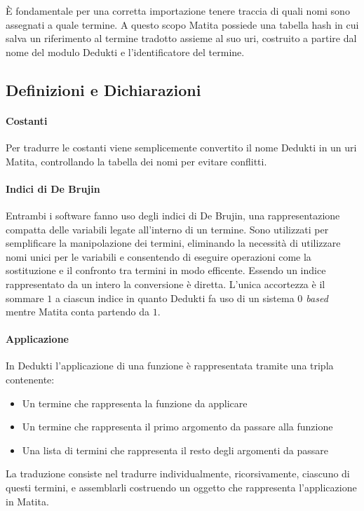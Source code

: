 \documentclass[12pt,a4paper]{mimosis}
\begin{document}
È fondamentale per una corretta importazione tenere traccia di quali nomi sono
assegnati a quale termine. A questo scopo Matita possiede una tabella hash in cui salva
un riferimento al termine tradotto assieme al suo uri, costruito a partire dal nome
del modulo Dedukti e l'identificatore del termine.


\subsection{Definizioni e Dichiarazioni}

\paragraph{Costanti}
Per tradurre le costanti viene semplicemente convertito il nome Dedukti in un 
uri Matita, controllando la tabella dei nomi per evitare conflitti.

\paragraph{Indici di De Brujin}
Entrambi i software fanno uso degli indici di De Brujin, una rappresentazione
compatta delle variabili legate all'interno di un termine. Sono utilizzati per
semplificare la manipolazione dei termini, eliminando la necessità di utilizzare
nomi unici per le variabili e consentendo di eseguire operazioni come la 
sostituzione e il confronto tra termini in modo efficente. 
Essendo un indice rappresentato da un intero la conversione è diretta.
L'unica accortezza è il sommare $1$ a ciascun indice in quanto
Dedukti fa uso di un sistema \textit{$0$ based} mentre Matita conta partendo
da $1$.

\paragraph{Applicazione}
In Dedukti l'applicazione di una funzione è rappresentata tramite una tripla
contenente: 
\begin{itemize}
  \item Un termine che rappresenta la funzione da applicare
  \item Un termine che rappresenta il primo argomento da passare alla funzione
  \item Una lista di termini che rappresenta il resto degli argomenti da passare
\end{itemize}

La traduzione consiste nel tradurre individualmente, ricorsivamente, ciascuno
di questi termini, e assemblarli costruendo un oggetto che rappresenta l'applicazione
in Matita. 
\end{document}
